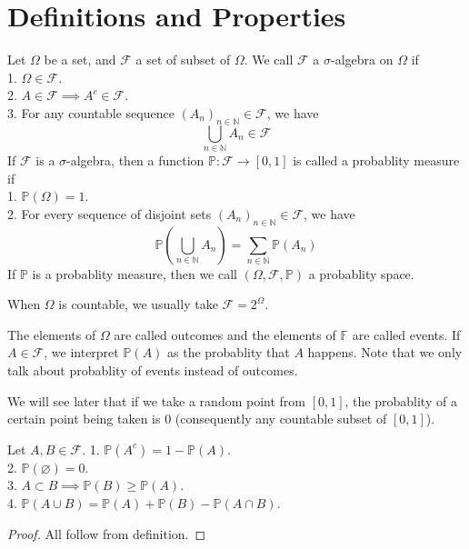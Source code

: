 \section{Definitions and Properties}
\begin{definition}
    Let $\Omega$ be a set, and $\mathscr F$ a set of subset of $\Omega$.
    We call $\mathscr F$ a $\sigma$-algebra on $\Omega$ if\\
    1. $\Omega\in\mathscr F$.\\
    2. $A\in\mathscr F\implies A^c\in\mathscr F$.\\
    3. For any countable sequence $(A_n)_{n\in\mathbb N}\in\mathscr F$, we have
    $$\bigcup_{n\in\mathbb N}A_n\in\mathscr F$$
    If $\mathscr F$ is a $\sigma$-algebra, then a function $\mathbb P:\mathscr F\to [0,1]$ is called a probablity measure if\\
    1. $\mathbb P(\Omega)=1$.\\
    2. For every sequence of disjoint sets $(A_n)_{n\in\mathbb N}\in\mathscr F$, we have
    $$\mathbb P\left( \bigcup_{n\in\mathbb N}A_n \right)=\sum_{n\in\mathbb N}\mathbb P(A_n)$$
    If $\mathbb P$ is a probablity measure, then we call $(\Omega,\mathscr F,\mathbb P)$ a probablity space.
\end{definition}
\begin{remark}
    When $\Omega$ is countable, we usually take $\mathscr F=2^\Omega$.
\end{remark}
\begin{definition}
    The elements of $\Omega$ are called outcomes and the elements of $\mathbb F$ are called events.
    If $A\in\mathscr F$, we interpret $\mathbb P(A)$ as the probablity that $A$ happens.
    Note that we only talk about probablity of events instead of outcomes.
\end{definition}
We will see later that if we take a random point from $[0,1]$, the probablity of a certain point being taken is $0$ (consequently any countable subset of $[0,1]$).
\begin{proposition}
    Let $A,B\in\mathscr F$.
    1. $\mathbb P(A^c)=1-\mathbb P(A)$.\\
    2. $\mathbb P(\varnothing)=0$.\\
    3. $A\subset B\implies\mathbb P(B)\ge \mathbb P(A)$.\\
    4. $\mathbb P(A\cup B)=\mathbb P(A)+\mathbb P(B)-\mathbb P(A\cap B)$.
\end{proposition}
\begin{proof}
    All follow from definition.
\end{proof}
